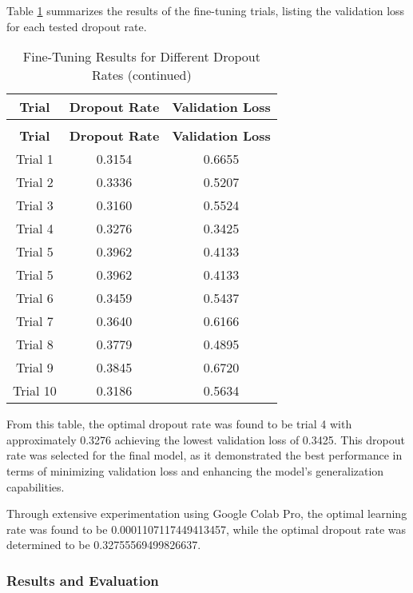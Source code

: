 Table \ref{tab:vit_finetune} summarizes the results of the fine-tuning trials, listing the validation loss for each tested dropout rate.

\begin{longtable}{|c|c|c|}
  \caption{Fine-Tuning Results for Different Dropout Rates}\label{tab:vit_finetune} \\
  \hline
  \textbf{Trial} & \textbf{Dropout Rate} & \textbf{Validation Loss} \\
  \hline
  \endfirsthead
  \caption[]{Fine-Tuning Results for Different Dropout Rates (continued)}\\
  \hline
  \textbf{Trial} & \textbf{Dropout Rate} & \textbf{Validation Loss} \\
  \hline
  \endhead
  \hline
  \endfoot
  \hline
  \endlastfoot
  Trial 1 & 0.3154 & 0.6655 \\
  \hline
  Trial 2 & 0.3336 & 0.5207 \\
  \hline
  Trial 3 & 0.3160 & 0.5524 \\
  \hline
  Trial 4 & 0.3276 & 0.3425 \\
  \hline
  Trial 5 & 0.3962 & 0.4133 \\
  \hline
  Trial 5 & 0.3962 & 0.4133 \\
  \hline
  Trial 6 & 0.3459 & 0.5437 \\
  \hline
  Trial 7 & 0.3640 & 0.6166 \\
  \hline
  Trial 8 & 0.3779 & 0.4895 \\
  \hline
  Trial 9 & 0.3845 & 0.6720 \\
  \hline
  Trial 10 & 0.3186 & 0.5634 \\
  \hline
  \end{longtable}

From this table, the optimal dropout rate was found to be trial 4 with approximately 0.3276 achieving the lowest validation loss of 0.3425. This dropout rate was selected for the final model, as it demonstrated the best performance in terms of minimizing validation loss and enhancing the model's generalization capabilities.

Through extensive experimentation using Google Colab Pro, the optimal learning rate was found to be 0.0001107117449413457, while the optimal dropout rate was determined to be 0.32755569499826637. 


\subsubsection{Results and Evaluation}


